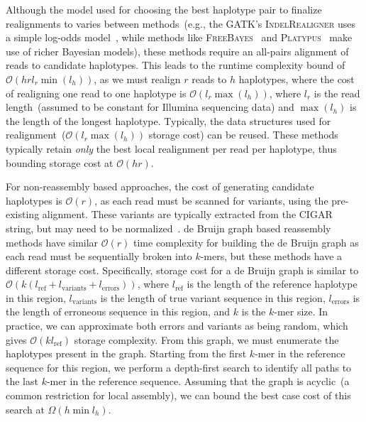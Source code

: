 \documentclass[phd]{ucbthesis}
\begin{document}
Although the model used for choosing the best haplotype pair to finalize realignments to varies between
methods~(e.g., the GATK's \textsc{IndelRealigner} uses a simple log-odds model~\cite{depristo11}, while
methods like \textsc{FreeBayes}~\cite{garrison12} and \textsc{Platypus}~\cite{rimmer14} make use of richer
Bayesian models), these methods require an all-pairs alignment of reads to candidate
haplotypes. This leads to the runtime complexity bound of $\mathcal{O}(h r l_r \min(l_h))$,
as we must realign $r$ reads to $h$ haplotypes, where the cost of realigning
one read to one haplotype is $\mathcal{O}(l_r \max(l_h))$, where $l_r$ is the read length~(assumed to be
constant for Illumina sequencing data) and $\max(l_h)$ is the length of the longest haplotype. Typically,
the data structures used for realignment~($\mathcal{O}(l_r \max(l_h))$ storage cost) can be reused.
These methods typically retain \emph{only} the best local realignment per read per haplotype, thus
bounding storage cost at $\mathcal{O}(h r)$.

For non-reassembly based approaches, the cost of generating candidate haplotypes is $\mathcal{O}(r)$,
as each read must be scanned for variants, using the pre-existing alignment. These variants are typically
extracted from the CIGAR string, but may need to be normalized~\cite{li14}. de Bruijn graph based 
reassembly methods have similar $\mathcal{O}(r)$ time complexity for building the de Bruijn
graph as each read must be sequentially broken into $k$-mers, but these methods have a different
storage cost. Specifically, storage cost for a de Bruijn graph is similar to $\mathcal{O}(k
(l_{\text{ref}} + l_{\text{variants}} + l_{\text{errors}}))$, where $l_{\text{ref}}$ is the length of the reference
haplotype in this region, $l_{\text{variants}}$ is the length of true variant sequence in this region, 
$l_{\text{errors}}$ is the length of erroneous sequence in this region, and $k$ is the $k$-mer size. In
practice, we can approximate both errors and variants as being random, which gives $\mathcal{O}(k
l_{\text{ref}})$ storage complexity. From this graph, we must enumerate the haplotypes present in the
graph. Starting from the first $k$-mer in the reference sequence for this region, we perform a depth-first
search to identify all paths to the last $k$-mer in the reference sequence. Assuming that the graph is
acyclic~(a common restriction for local assembly), we can
bound the best case cost of this search at $\Omega(h \min l_h)$.
\end{document}
